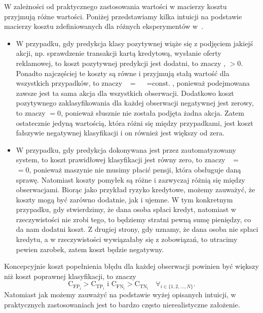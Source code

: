\documentclass[inzynierska]{pwr_wmat_praca_dyplomowa}
\theoremstyle{plain}
\numberwithin{theorem}{chapter}
\theoremstyle{definition}
\numberwithin{theorem}{chapter}
\begin{document}
W zależności od praktycznego zastosowania wartości w macierzy kosztu przyjmują różne wartości. Poniżej przedstawiamy kilka intuicji na podstawie macierzy kosztu zdefiniowanych dla różnych eksperymentów w~\cite{alej2015ensemble}.
\begin{itemize}
	\item W przypadku, gdy predykcja klasy pozytywnej wiąże się z podjęciem jakiejś akcji, np. sprawdzenie transakcji kartą kredytową, wysłanie oferty reklamowej, to koszt pozytywnej predykcji jest dodatni, to znaczy ,  $>0$. Ponadto najczęściej te koszty są równe i przyjmują stałą wartość dla wszystkich przypadków, to znaczy ~$=$~~$= \text{const.}$, ponieważ podejmowana zawsze jest ta sama akcja dla wszystkich obserwacji. Dodatkowo koszt pozytywnego zaklasyfikowania dla każdej obserwacji negatywnej jest zerowy, to znaczy  $=0$, ponieważ słusznie nie została podjęta żadna akcja. Zatem ostatecznie jedyną wartością, która różni się między przypadkami, jest koszt fałszywie negatywnej klasyfikacji i on również jest większy od zera.
	\item W przypadku, gdy predykcja dokonywana jest przez zautomatyzowany system, to koszt prawidłowej klasyfikacji jest równy zero, to znaczy ~$=$~~$=0$, ponieważ maszynie nie musimy płacić pensji, która obsługuje daną sprawę. Natomiast koszty pomyłek są różne i zazwyczaj różnią się między obserwacjami. Biorąc jako przykład ryzyko kredytowe, możemy zauważyć, że koszty mogą być zarówno dodatnie, jak i ujemne. W tym konkretnym przypadku, gdy stwierdzimy, że dana osoba spłaci kredyt, natomiast w rzeczywistości nie zrobi tego, to będziemy stratni pewną sumę pieniędzy, co da nam dodatni koszt. Z drugiej strony, gdy uznamy, że dana osoba nie spłaci kredytu, a w rzeczywistości wywiązałaby się z zobowiązań, to utracimy pewien zarobek, zatem koszt będzie negatywny.
\end{itemize}

Koncepcyjnie koszt popełnienia błędu dla każdej obserwacji powinien być większy niż koszt poprawnej klasyfikacji, to znaczy
$$ \text{C}_{\text{FP}_{\text{i}}} >\text{C}_{\text{TP}_{\text{i}}} \text{ i } \text{C}_{\text{FN}_{\text{i}}} > \text{C}_{\text{TN}_{\text{i}}} \quad \forall_{i \in \{1, 2, \dots, N\}} \text{.}$$
Natomiast jak możemy zauważyć na podstawie wyżej opisanych intuicji, w praktycznych zastosowaniach jest to bardzo często nierealistyczne założenie.
\end{document}
